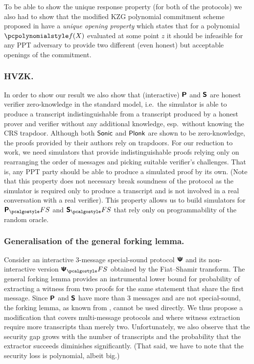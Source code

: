 \let\accentvec\vec \documentclass[runningheads]{llncs}
\begin{document}
To be able to show the unique response property (for both of the protocols) we
also had to show that the modified KZG polynomial commitment scheme \cite{AC:KatZavGol10}
proposed in \cite{EPRINT:GabWilCio19,CCS:MBKM19} have a \emph{unique opening
property} which states that for a polynomial $\p{f}(X)$ evaluated at some
point $z$ it should be infeasible for any PPT adversary to provide
two different (even honest) but acceptable openings of the commitment. 

\subsubsection{HVZK.}%
In order to show our result we also show that (interactive) $\bm{\mathsf{P}}$ and
$\bm{\mathsf{S}}$ are
honest verifier zero-knowledge in the standard model, i.e.~the simulator is
able to produce a transcript indistinguishable from a transcript produced by a
honest prover and verifier without any additional knowledge, esp.~without
knowing the CRS trapdoor.
Although both ${\textnormal{\textsf{Sonic}}}$ and $\textnormal{\textsf{Plonk}}$ are shown to be zero-knowledge, the proofs
provided by their authors rely on trapdoors. For our reduction to work,
we need simulators that provide indistinguishable proofs relying only on
rearranging the order of messages and picking suitable verifier's challenges. 
That is, any PPT
party should be able to produce a simulated proof by its own. (Note that this property
does not necessary break soundness of the protocol as the simulator is
required only to produce a transcript and is not involved in a real
conversation with a real verifier).
This property allows us to build simulators for $\plonkprotfs$ and
$\sonicprotfs$ that rely only on programmability of the random oracle.

\subsubsection{Generalisation of the general forking lemma.}
Consider an interactive $3$-message special-sound protocol $\bm{\mathsf{\Psi}}$ and its
non-interactive version $\ps_\fs$ obtained by the Fiat--Shamir
transform.  The general forking lemma provides an instrumental lower bound for
probability of extracting a witness from two proofs for the same statement
that share the first message. Since $\bm{\mathsf{P}}$ and $\bm{\mathsf{S}}$ have more
than $3$ messages and are not special-sound, the forking lemma, as known from
\cite{CCS:BelNev06}, cannot be used
directly. We thus propose a modification that covers multi-message protocols
and where witness extraction require more transcripts than merely two.
Unfortunately, we also observe that the security gap grows with the number of transcripts and the
probability that the
extractor succeeds diminishes significantly. (That said, we have to note that
the security loss is polynomial, albeit big.)
\end{document}
